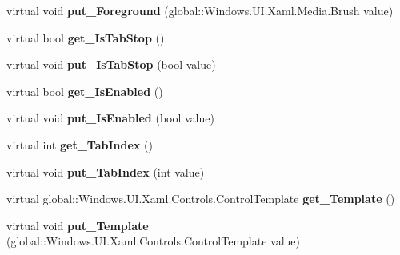 \begin{DoxyCompactItemize}
virtual void {\bfseries put\+\_\+\+Foreground} (global\+::\+Windows.\+U\+I.\+Xaml.\+Media.\+Brush value)
\item 
\mbox{\label{class_windows_1_1_u_i_1_1_xaml_1_1_controls_1_1_control_a4aed62fb59fe596d9d9727b4fa885234}} 
virtual bool {\bfseries get\+\_\+\+Is\+Tab\+Stop} ()
\item 
\mbox{\label{class_windows_1_1_u_i_1_1_xaml_1_1_controls_1_1_control_a494c6dd6af97e18d86690cb2cae23c3d}} 
virtual void {\bfseries put\+\_\+\+Is\+Tab\+Stop} (bool value)
\item 
\mbox{\label{class_windows_1_1_u_i_1_1_xaml_1_1_controls_1_1_control_ad11dee8e9b7e09556e69903cade192dd}} 
virtual bool {\bfseries get\+\_\+\+Is\+Enabled} ()
\item 
\mbox{\label{class_windows_1_1_u_i_1_1_xaml_1_1_controls_1_1_control_ae951ae9f8506d85d623dc31713092569}} 
virtual void {\bfseries put\+\_\+\+Is\+Enabled} (bool value)
\item 
\mbox{\label{class_windows_1_1_u_i_1_1_xaml_1_1_controls_1_1_control_a58eef00fd623bde61c10893d9205700b}} 
virtual int {\bfseries get\+\_\+\+Tab\+Index} ()
\item 
\mbox{\label{class_windows_1_1_u_i_1_1_xaml_1_1_controls_1_1_control_a8314612345a1e430bb7f8d51cdb9b131}} 
virtual void {\bfseries put\+\_\+\+Tab\+Index} (int value)
\item 
\mbox{\label{class_windows_1_1_u_i_1_1_xaml_1_1_controls_1_1_control_a2e40dea64382201f30a45dc2c9db69be}} 
virtual global\+::\+Windows.\+U\+I.\+Xaml.\+Controls.\+Control\+Template {\bfseries get\+\_\+\+Template} ()
\item 
\mbox{\label{class_windows_1_1_u_i_1_1_xaml_1_1_controls_1_1_control_adc937135b0249a6d3425011c1b394db2}} 
virtual void {\bfseries put\+\_\+\+Template} (global\+::\+Windows.\+U\+I.\+Xaml.\+Controls.\+Control\+Template value)

\end{DoxyCompactItemize}
